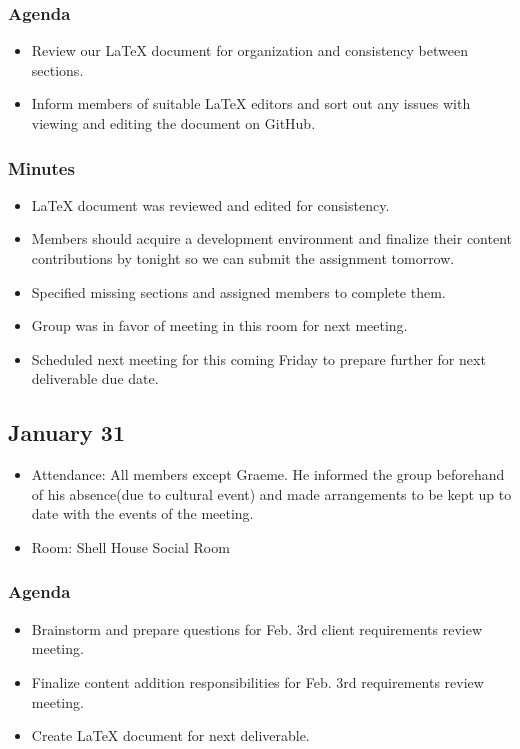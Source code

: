 \documentclass{article}
\begin{document}
\subsubsection{Agenda}
\begin{itemize}
\item Review our LaTeX document for organization and consistency between
 sections.
\item Inform members of suitable LaTeX editors and sort out any issues with
 viewing and editing the document on GitHub.
\end{itemize}
\subsubsection{Minutes}
\begin{itemize}
\item LaTeX document was reviewed and edited for consistency.
\item Members should acquire a development environment and finalize their 
content contributions by tonight so we can submit the assignment tomorrow.
\item Specified missing sections and assigned members to complete them.
\item Group was in favor of meeting in this room for next meeting.
\item Scheduled next meeting for this coming Friday to prepare further
 for next deliverable due date.
\end{itemize}

\subsection{January 31}
\begin{itemize}
\item Attendance: All members except Graeme.  He informed the group 
beforehand of his absence(due to cultural event) and made arrangements to 
be kept up to date with the events of the meeting.
\item Room: Shell House Social Room
\end{itemize}
\subsubsection{Agenda}
\begin{itemize}
\item Brainstorm and prepare questions for Feb. 3rd client 
requirements review meeting.
\item Finalize content addition responsibilities for Feb. 
3rd requirements review meeting.  
\item Create LaTeX document for next deliverable.
\end{itemize}
\end{document}
